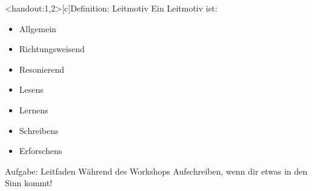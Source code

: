 \begin{frame}<handout:1,2>[c]{Definition: Leitmotiv}
    \vspace{0.5cm}
    \large{
    Ein Leitmotiv ist:}
    \begin{itemize}[<+(1)->]
        \large
        \item Allgemein
        \item Richtungsweisend
        \item Resonierend
    \end{itemize}
    \pause
    \vspace{0.4cm}
    {  }
    \begin{multicols}{2}
    \begin{itemize}[<+(1)->]
        \item Lesens
        \item Lernens
        \item Schreibens
        \item Erforschens
    \end{itemize}
    \end{multicols}
\end{frame}



\begin{frame}[c]{Aufgabe: Leitfaden}
    \Large
    Während des Workshops Aufschreiben, wenn dir etwas in den Sinn kommt!
\end{frame}


%



